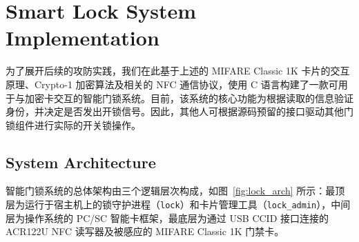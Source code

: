\documentclass[sigconf]{acmart}
\begin{document}
\section{Smart Lock System Implementation}
\label{sec:White part}

为了展开后续的攻防实践，我们在此基于上述的 MIFARE Classic 1K 卡片的交互原理、Crypto-1 加密算法及相关的 NFC 通信协议，使用 C 语言构建了一款可用于与加密卡交互的智能门锁系统。目前，该系统的核心功能为根据读取的信息验证身份，并决定是否发出开锁信号。因此，其他人可根据源码预留的接口驱动其他门锁组件进行实际的开关锁操作。

\subsection{System Architecture}

智能门锁系统的总体架构由三个逻辑层次构成，如图~\ref{fig:lock_arch} 所示：最顶层为运行于宿主机上的锁守护进程（\texttt{lock}）和卡片管理工具（\texttt{lock\_admin}），中间层为操作系统的 PC/SC 智能卡框架，最底层为通过 USB CCID 接口连接的 ACR122U NFC 读写器及被感应的 MIFARE Classic 1K 门禁卡。
\end{document}
